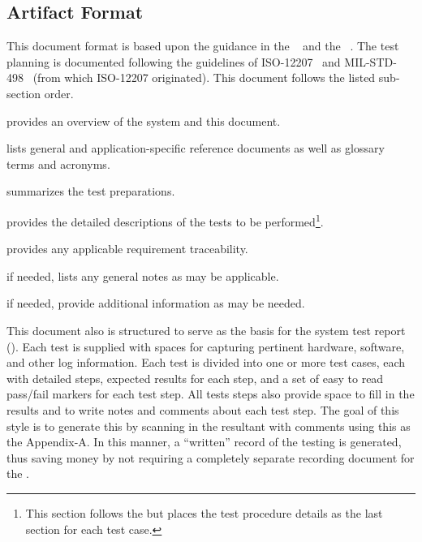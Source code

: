 
\subsection{Artifact Format}
\label{loc:DocOverview_ArtifactFormat}

This document format is based upon the guidance in the \STD{} \DID~\cite{ref__STD_DID} and the \STR{} \DID~\cite{ref__STR_DID}.
The test planning is documented following the guidelines of ISO-12207~\cite{ref__ISO_12207} and MIL-STD-498~\cite{ref__MIL_STD_498} (from which ISO-12207 originated).
This document follows the listed \STS sub-section order.
\begin{description}[itemindent=5pt,topsep=0pt,itemsep=0pt,partopsep=0pt, parsep=0pt]
	\item[Section 1] provides an overview of the system and this document.
	\item[Section 2] lists general and application-specific reference documents as well as glossary terms and acronyms. 
	\item[Section 3] summarizes the test preparations.
	\item[Section 4] provides the detailed descriptions of the tests to be performed\footnote{This section follows the \DID but places the test procedure details as the last section for each test case.}. 
	\item[Section 5] provides any applicable requirement traceability.
	\item[Section 6] if needed, lists any general notes as may be applicable.
	\item[Appendices] if needed, provide additional information as may be needed.
\end{description}


This document also is structured to serve as the basis for the system test report (\STR).
Each test is supplied with spaces for capturing pertinent hardware, software, and other log information.
Each test is divided into one or more test cases, each with detailed steps, expected results for each step, and a set of easy to read pass/fail markers for each test step.
All tests steps also provide space to fill in the results and to write notes and comments about each test step.
The goal of this style is to generate this \STR by scanning in the resultant \STS with comments using this as the  \STR Appendix-A.
In this manner, a ``written'' record of the testing is generated, thus saving money by not requiring a completely separate recording document for the \STR.



